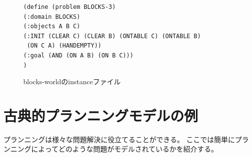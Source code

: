\documentclass[10pt]{book}
\begin{document}
\begin{figure}
\lstset{language=pddl,basicstyle=\ttfamily\footnotesize,breaklines=true}
\begin{lstlisting}
(define (problem BLOCKS-3)
(:domain BLOCKS)
(:objects A B C)
(:INIT (CLEAR C) (CLEAR B) (ONTABLE C) (ONTABLE B)
 (ON C A) (HANDEMPTY))
(:goal (AND (ON A B) (ON B C)))
)

\end{lstlisting}
\caption{blocks-worldのinstanceファイル}
\label{fig:pddl-instance}
\end{figure}

\section{古典的プランニングモデルの例}
\label{sec:classical-planning-example}

プランニングは様々な問題解決に役立てることができる。
ここでは簡単にプランニングによってどのような問題がモデルされているかを紹介する。
\end{document}
